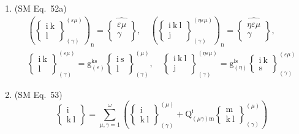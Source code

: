 \documentclass[12pt]{article}
\begin{document}
\begin{enumerate}[label=(\arabic*), series=formellist]
    \item (SM Eq.\ 52a) 
    \[
    \begin{gathered}
    \left( \left\{ \begin{smallmatrix} \mathrm{i\ k} \\ \mathrm{l} \end{smallmatrix} \right\}^{(\varepsilon\mu)}_{(\gamma)} \right)_\mathrm{n} = \widehat{\left\{ \begin{smallmatrix} \varepsilon\mu \\ \gamma \end{smallmatrix} \right\}}, \quad \left( \left\{ \begin{smallmatrix} \mathrm{i\ k\ l} \\ \mathrm{j} \end{smallmatrix} \right\}^{(\eta\varepsilon\mu)}_{(\gamma)} \right)_\mathrm{n} = \widehat{\left\{ \begin{smallmatrix} \eta\varepsilon\mu \\ \gamma \end{smallmatrix} \right\}}, \\
    \left\{ \begin{smallmatrix} \mathrm{i\ k} \\ \mathrm{l} \end{smallmatrix} \right\}^{(\varepsilon\mu)}_{(\gamma)} = \mathrm{g}_{(\varepsilon)}^{\mathrm{ks}}\left\{ \begin{smallmatrix} \mathrm{i\ s} \\ \mathrm{l} \end{smallmatrix} \right\}^{(\mu)}_{(\gamma)}, \quad \left\{ \begin{smallmatrix} \mathrm{i\ k\ l} \\ \mathrm{j} \end{smallmatrix} \right\}^{(\eta\varepsilon\mu)}_{(\gamma)} = \mathrm{g}_{(\eta)}^{\mathrm{ls}}\left\{ \begin{smallmatrix} \mathrm{i\ k} \\ \mathrm{s} \end{smallmatrix} \right\}^{(\varepsilon\mu)}_{(\gamma)}
    \end{gathered}
    \]

    \item (SM Eq.\ 53) 
    \[
    \left\{ \begin{smallmatrix} \mathrm{i} \\ \mathrm{k\ l} \end{smallmatrix} \right\} = \sum_{\mu,\gamma=1}^\omega \left( \left\{ \begin{smallmatrix} \mathrm{i} \\ \mathrm{k\ l} \end{smallmatrix} \right\}^{(\mu)}_{(\gamma)} + \mathrm{Q}^\mathrm{i}_{(\mu\gamma)\mathrm{m}} \left\{ \begin{smallmatrix} \mathrm{m} \\ \mathrm{k\ l} \end{smallmatrix} \right\}^{(\mu)}_{(\gamma)} \right)
    \]


\end{enumerate}
\end{document}
